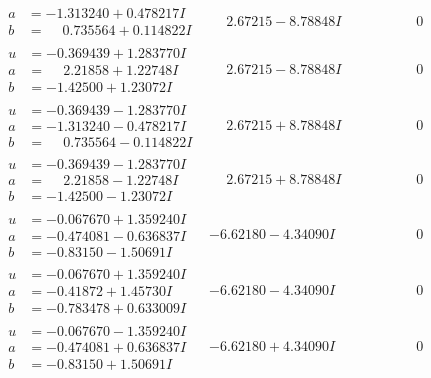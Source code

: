 \documentclass[1p]{elsarticle_modified}
\theoremstyle{definition}
\begin{document}
$$\begin{array}{c|c|c}
\begin{aligned}
a &= -1.313240 + 0.478217 I \\
b &= \phantom{-}0.735564 + 0.114822 I\end{aligned}
 & \phantom{-}2.67215 - 8.78848 I & \phantom{-0.000000 } 0 \\ \hline\begin{aligned}
u &= -0.369439 + 1.283770 I \\
a &= \phantom{-}2.21858 + 1.22748 I \\
b &= -1.42500 + 1.23072 I\end{aligned}
 & \phantom{-}2.67215 - 8.78848 I & \phantom{-0.000000 } 0 \\ \hline\begin{aligned}
u &= -0.369439 - 1.283770 I \\
a &= -1.313240 - 0.478217 I \\
b &= \phantom{-}0.735564 - 0.114822 I\end{aligned}
 & \phantom{-}2.67215 + 8.78848 I & \phantom{-0.000000 } 0 \\ \hline\begin{aligned}
u &= -0.369439 - 1.283770 I \\
a &= \phantom{-}2.21858 - 1.22748 I \\
b &= -1.42500 - 1.23072 I\end{aligned}
 & \phantom{-}2.67215 + 8.78848 I & \phantom{-0.000000 } 0 \\ \hline\begin{aligned}
u &= -0.067670 + 1.359240 I \\
a &= -0.474081 - 0.636837 I \\
b &= -0.83150 - 1.50691 I\end{aligned}
 & -6.62180 - 4.34090 I & \phantom{-0.000000 } 0 \\ \hline\begin{aligned}
u &= -0.067670 + 1.359240 I \\
a &= -0.41872 + 1.45730 I \\
b &= -0.783478 + 0.633009 I\end{aligned}
 & -6.62180 - 4.34090 I & \phantom{-0.000000 } 0 \\ \hline\begin{aligned}
u &= -0.067670 - 1.359240 I \\
a &= -0.474081 + 0.636837 I \\
b &= -0.83150 + 1.50691 I\end{aligned}
 & -6.62180 + 4.34090 I & \phantom{-0.000000 } 0 \\ \hline\begin{aligned}

\end{aligned}
\end{array}$$
\end{document}
